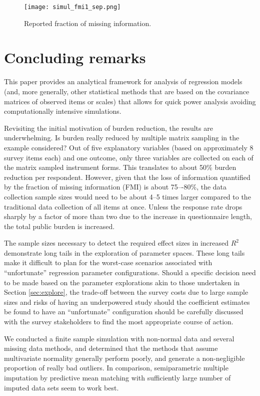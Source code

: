 \documentclass[11pt]{asaproc}
\begin{document}
\begin{figure}[!bh]
  \centering
  \texttt{[image: simul\_fmi1\_sep.png]}
  \caption{Reported fraction of missing information.}\label{fig:simul:fmi}
\end{figure}

\section{Concluding remarks}

This paper provides an analytical framework for analysis of regression models
(and, more generally, other statistical methods that are based on the covariance matrices of observed
items or scales)
that allows for quick power analysis avoiding computationally intensive simulations.

Revisiting the initial motivation of burden reduction, the results are underwhelming.
Is burden really reduced by multiple matrix sampling in the example considered?
Out of five explanatory variables (based on approximately 8 survey items each) and one outcome,
only three variables are collected on each of the matrix sampled instrument forms.
This translates to about 50\% burden reduction per respondent. However,
given that the loss of information quantified by the fraction of missing information
(FMI) is about 75–-80\%, the data collection sample sizes would
need to be about 4--5 times larger compared to the traditional data collection
of all items at once.
Unless the response rate drops sharply by a factor of more than two due to
the increase in questionnaire length, the total public burden is increased.

The sample sizes necessary to detect the required effect sizes in increased $R^2$
demonstrate long tails in the exploration of parameter spaces. These long tails
make it difficult to plan for the worst-case scenarios associated with ``unfortunate''
regression parameter configurations. Should a specific decision need to be made
based on the parameter explorations akin to those undertaken in Section \ref{sec:explore},
the trade-off between the survey costs due to large sample sizes and risks of having
an underpowered study should the coefficient estimates be found to have an ``unfortunate''
configuration should be carefully discussed with the survey stakeholders to find
the most appropriate course of action.

We conducted a finite sample simulation with non-normal data and several missing data methods,
and determined that the methods that assume multivariate normality generally perform poorly,
and generate a non-negligible proportion of really bad outliers. In comparison,
semiparametric multiple imputation by predictive mean matching with sufficiently large
number of imputed data sets seem to work best.
\end{document}
